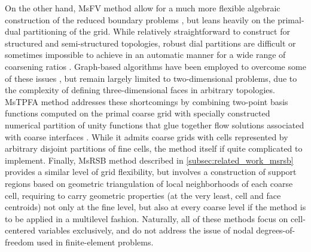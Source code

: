 On the other hand, MsFV method allow for a much more flexible algebraic construction of the reduced boundary problems \cite{Wang2014}, but leans heavily on the primal-dual partitioning of the grid.   While relatively straightforward to construct for structured and semi-structured topologies, robust dial partitions are difficult or sometimes impossible to achieve in an automatic manner for a wide range of coarsening ratios \cite{Moyner2014a}.   Graph-based algorithms have been employed to overcome some of these issues \cite{Mehrdoost2019}, but remain largely limited to two-dimensional problems, due to the complexity of defining three-dimensional faces in arbitrary topologies.   MsTPFA method addresses these shortcomings by combining two-point basis functions computed on the primal coarse grid with specially constructed numerical partition of unity functions that glue together flow solutions associated with coarse interfaces \cite{Moyner2014}.   While it admits coarse grids with cells represented by arbitrary disjoint partitions of fine cells, the method itself if quite complicated to implement.   Finally, MsRSB method described in \cref{subsec:related_work_msrsb} provides a similar level of grid flexibility, but involves a construction of support regions based on geometric triangulation of local neighborhoods of each coarse cell, requiring to carry geometric properties (at the very least, cell and face centroids) not only at the fine level, but also at every coarse level if the method is to be applied in a multilevel fashion.   Naturally, all of these methods focus on cell-centered variables exclusively, and do not address the issue of nodal degrees-of-freedom used in finite-element problems.

